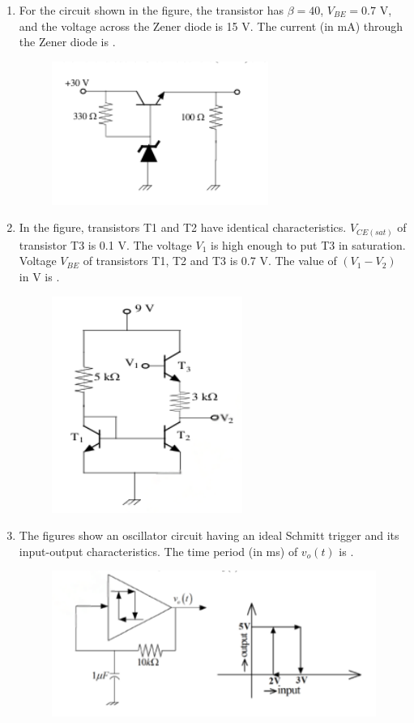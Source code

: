 \documentclass[journal,12pt,onecolumn]{IEEEtran}
\theoremstyle{remark}
\begin{document}
\begin{enumerate}
    \item For the circuit shown in the figure, the transistor has $\beta = 40$, $V_{BE} = 0.7$ V, and the voltage across the Zener diode is 15 V. The current (in mA) through the Zener diode is \underline{\hspace{2cm}}.
    \begin{figure}[H]
        \centering
        \includegraphics[width=0.4\columnwidth]{q38}
        \caption*{}
        \label{fig:placeholder}
    \end{figure}

    \item In the figure, transistors T1 and T2 have identical characteristics. $V_{CE(sat)}$ of transistor T3 is 0.1 V. The voltage $V_1$ is high enough to put T3 in saturation. Voltage $V_{BE}$ of transistors T1, T2 and T3 is 0.7 V. The value of $(V_1 - V_2)$ in V is \underline{\hspace{2cm}}.
    \begin{figure}[H]
        \centering
        \includegraphics[width=0.4\columnwidth]{q39}
        \caption*{}
        \label{fig:placeholder}
    \end{figure}

    \item The figures show an oscillator circuit having an ideal Schmitt trigger and its input-output characteristics. The time period (in ms) of $v_o(t)$ is \underline{\hspace{2cm}}.
    \begin{figure}[H]
        \centering
        \includegraphics[width=0.55\columnwidth]{q40}
        \caption*{}
        \label{fig:placeholder}
    \end{figure}
    

\end{enumerate}
\end{document}
